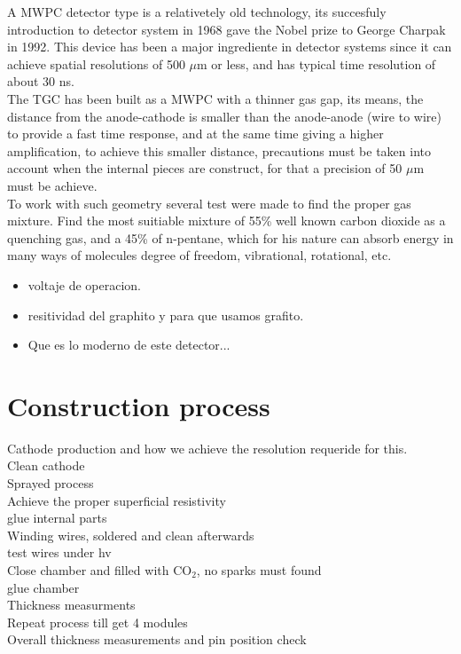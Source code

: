 A MWPC detector type  is a relativetely old technology, its succesfuly introduction to detector system in 1968 gave the Nobel prize to George Charpak in 1992. This device has
been a major ingrediente in detector systems since it can achieve spatial resolutions of 500 $\mu$m or less, and has typical time resolution of about 30 ns.\\
The TGC has been built as a MWPC with a thinner gas gap, its means, the distance from the anode-cathode is smaller than the anode-anode (wire to wire) to
provide a fast time response, and at the same time giving a higher amplification, to achieve this smaller distance, precautions must be taken into account when
the internal pieces are construct, for that a precision of 50 $\mu$m must be achieve.\\ To work with such geometry several test were made to find the proper gas
mixture\cite{gaschoice}. Find the most suitiable mixture of  55\% well known carbon dioxide as a quenching gas, and a 45\% of n-pentane, which for his nature
can absorb energy in many ways of molecules  degree of freedom, vibrational, rotational, etc.\\ 


\begin{itemize}
\item voltaje de operacion.
\item resitividad del graphito y para que usamos grafito.
\item Que es lo moderno de este detector...
\end{itemize}


\section{Construction process}
Cathode production and how we achieve the resolution requeride for this.\\
Clean cathode\\
Sprayed process\\
Achieve the proper superficial resistivity\\
glue internal parts\\
Winding wires, soldered and clean afterwards\\
test wires under hv\\
Close chamber and filled with CO$_2$, no sparks must found\\
glue chamber\\
Thickness measurments\\
Repeat process till get 4 modules\\
Overall thickness measurements and pin position check\\


